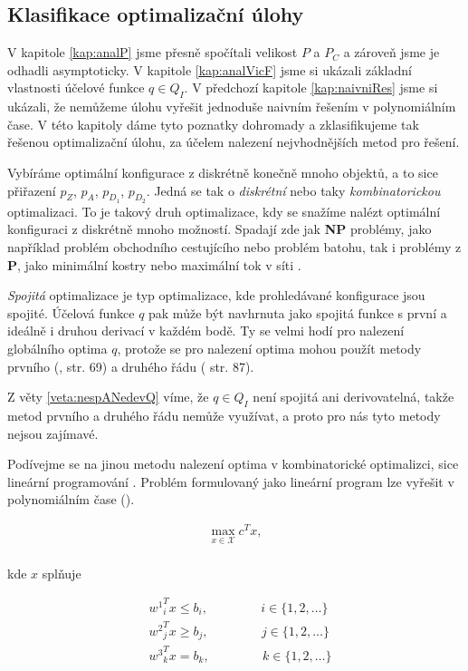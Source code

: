 \subsection{Klasifikace optimalizační úlohy}

V kapitole \ref{kap:analP} jsme přesně spočítali velikost $P$ a $P_C$ a zároveň jsme je odhadli asymptoticky.
V kapitole \ref{kap:analVicF} jsme si ukázali základní vlastnosti účelové funkce $q \in Q_I$.
V předchozí kapitole \ref{kap:naivniRes} jsme si ukázali, že nemůžeme úlohu vyřešit jednoduše naivním řešením v polynomiálním čase.
V této kapitoly dáme tyto poznatky dohromady a zklasifikujeme tak řešenou optimalizační úlohu, za účelem nalezení nejvhodnějších metod pro řešení.

Vybíráme optimální konfigurace z diskrétně konečně mnoho objektů, a to sice přiřazení $p_Z$, $p_A$, $p_{D_{1}}$, $p_{D_{2}}$.
Jedná se tak o \textit{diskrétní} nebo taky \textit{kombinatorickou} optimalizaci.
To je takový druh optimalizace, kdy se snažíme nalézt optimální konfiguraci z diskrétně mnoho možností.
Spadají zde jak \textbf{NP} problémy, jako například problém obchodního cestujícího nebo problém batohu, tak i problémy z \textbf{P}, jako minimální kostry nebo maximální tok v síti \cite{CO}.

\textit{Spojitá} optimalizace je typ optimalizace, kde prohledávané konfigurace jsou spojité.
Účelová funkce $q$ pak může být navhrnuta jako spojitá funkce s první a ideálně i druhou derivací v každém bodě.
Ty se velmi hodí pro nalezení globálního optima $q$, protože se pro nalezení optima mohou použít metody prvního (\citet{AlgOptBook}, str. 69) a druhého řádu (\citet{AlgOptBook} str. 87).

Z věty \ref{veta:nespANedevQ} víme, že $q \in Q_I$ není spojitá ani derivovatelná, takže metod prvního a druhého řádu nemůže využívat, a proto pro nás tyto metody nejsou zajímavé.

Podívejme se na jinou metodu nalezení optima v kombinatorické optimalizci, sice lineární programování \cite{LP}.
Problém formulovaný jako lineární program lze vyřešit v polynomiálním čase (\citet{cohen2020solving}).

\begin{definice}
  \begin{align*}
    \max_{x \in \mathcal{X}} c^T x,
  \end{align*}
  \\
  kde $x$ splňuje

  \begin{align*}
    &{w^1}^T_i x \leq b_i, \hspace{50pt} i \in \{ 1, 2, \dots \} \\
    &{w^2}^T_j x \geq b_j, \hspace{50pt} j \in \{ 1, 2, \dots \} \\
    &{w^3}^T_k x = b_k,    \hspace{50pt} k \in \{ 1, 2, \dots \}
  \end{align*}
\end{definice}


